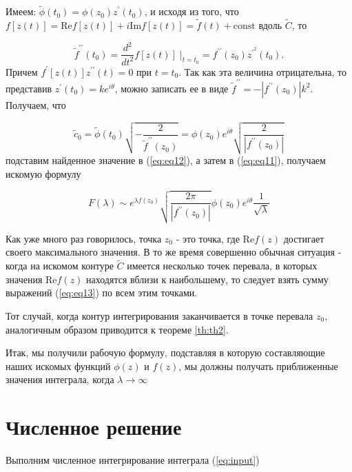 \documentclass[14pt]{extarticle}
\renewcommand{\Re}{\mathrm{Re}}
\renewcommand{\Im}{\mathrm{Im}}
\newcommand{\const}{\mathrm{const}}
\begin{document}
	Имеем: $\widetilde{\phi}(t_0) = \phi(z_0) z^\prime (t_0)$, и исходя из того, что $f[z(t)] = \Re f[z(t)]+ i \Im f[z(t)] = \widetilde{f}(t)+\const$ вдоль $\widetilde{C}$, то
	
	\begin{equation}\nonumber
	\widetilde{f}^{\prime\prime} (t_0) = \frac{d^2}{d t^2} f[z(t)]\;|_{t=t_0} = f^{\prime\prime} (z_0) z^{\prime^2} (t_0).
	\end{equation}
	Причем $f^\prime[z(t)] z^{\prime \prime} (t) = 0$ при $t=t_0$. Так как эта величина отрицательна, то представив $z^\prime (t_0) = k e^{i \theta}$, можно записать ее в виде $\widetilde{f}^{\prime\prime}=-|f^{\prime\prime}(z_0)| k^2$. Получаем, что 
	
	\begin{equation}\nonumber
	\widetilde{c}_0=\widetilde{\phi}(t_0) \sqrt{-\frac{2}{\widetilde{f}^{\prime\prime}(z_0)}}= \phi (z_0) e^{i \theta} \sqrt{\frac{2}{|f^{\prime\prime}(z_0)|}}
	\end{equation}
	подставим найденное значение в (\ref{eq:eq12}), а затем в (\ref{eq:eq11}), получаем искомую формулу
	
	\begin{equation}\label{eq:eq13}
	F(\lambda) \sim e^{\lambda f (z_0)}\sqrt{\frac{2\pi}{|f^{\prime \prime} (z_0)|}} \phi(z_0) e^{i \theta} \frac{1}{\sqrt{\lambda}}
	\end{equation}
	
	Как уже много раз говорилось, точка $z_0$ - это точка, где $\Re f(z)$ достигает своего максимального значения. В то же время совершенно обычная ситуация - когда на искомом контуре $\widetilde{C}$ имеется несколько точек перевала, в которых значения $\Re f (z)$ находятся вблизи к наибольшему, то следует взять сумму выражений (\ref{eq:eq13}) по всем этим точками. 
	
	Тот случай, когда контур интегрирования заканчивается в точке перевала $z_0$, аналогичным образом приводится к теореме \ref{th:th2}.
	
	Итак, мы получили рабочую формулу, подставляя в которую составляющие наших искомых функций $\phi (z)$ и $f (z)$, мы должны получать приближенные значения интеграла, когда $\lambda \rightarrow \infty$ 

\newpage
\section{Численное решение}

Выполним численное интегрирование интеграла (\ref{eq:input})
\end{document}
